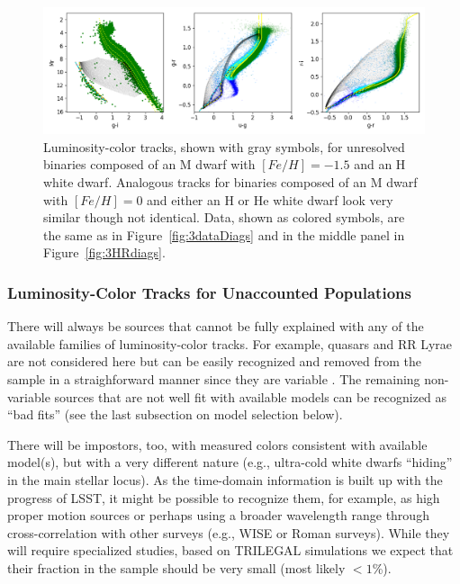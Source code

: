 \begin{figure}[ht!]
\includegraphics[width=1.0\textwidth,angle=0]{figures/plot3diagsBA_DAh.png}  
\caption{Luminosity-color tracks, shown with gray symbols, for unresolved binaries composed of an M dwarf with
  $[Fe/H]=-1.5$ and an H white dwarf. Analogous tracks for binaries composed of an M dwarf with
  $[Fe/H]=0$ and either an H or He white dwarf look very similar though not identical. Data, shown as colored symbols,
  are the same as in Figure~\ref{fig:3dataDiags} and in the middle panel in Figure~\ref{fig:3HRdiags}.} 
\label{fig:locusBinaries}
\end{figure}

 


\subsubsection{Luminosity-Color Tracks for Unaccounted Populations}

There will always be sources that cannot be fully explained with any of the available families of
luminosity-color tracks. For example, quasars and RR Lyrae are not considered here
but can be easily recognized and removed from the sample in a straighforward manner since
they are variable \citep[e.g., see][]{2007AJ....134.2236S}. The remaining non-variable sources
that are not well fit with available models can be recognized as ``bad fits'' (see the last subsection on
model selection below). 

There will be impostors, too, with measured colors consistent with available model(s), but
with a very different nature (e.g., ultra-cold white dwarfs ``hiding'' in the main stellar locus).
As the time-domain information is built up with the progress of LSST, 
it might be possible to recognize them, for example, as high proper motion sources or perhaps
using a broader wavelength range through cross-correlation with other surveys (e.g., WISE or
Roman surveys). While they will require specialized studies, based on TRILEGAL simulations
we expect that their fraction in the sample should be very small (most likely $<1$\%). 


